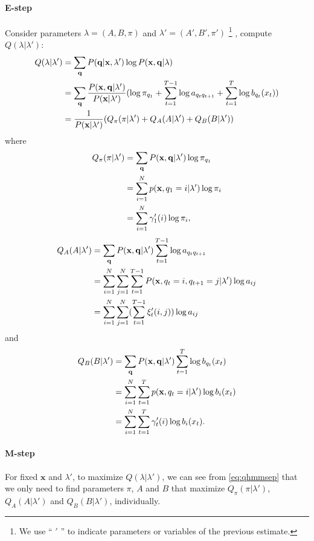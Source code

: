 \documentclass[12pt,final,twoside]{report}
\begin{document}
\paragraph{E-step}
Consider parameters $\lambda=(A,B,\pi)$ and $\lambda'=(A',B',\pi')$ 
\footnote{We use `` $'$ '' to indicate parameters or variables of the previous estimate.}
, compute $Q(\lambda|\lambda')$:
\begin{align}
  Q(\lambda|\lambda') &= \sum_{\mathbf{q}} P(\mathbf{q}|\mathbf{x},\lambda') \log P(\mathbf{x},\mathbf{q}|\lambda) \notag\\
  &= \sum_{\mathbf{q}} \frac{P(\mathbf{x},\mathbf{q}|\lambda')}{P(\mathbf{x}|\lambda')} 
  (\log \pi_{q_1} + \sum_{t=1}^{T-1} \log a_{q_t q_{t+1}} + \sum_{t=1}^{T} \log b_{q_t}(x_t) ) \notag\\
  &= \frac{1}{P(\mathbf{x}|\lambda')} (Q_\pi(\pi|\lambda') + Q_A(A|\lambda') + Q_B(B|\lambda'))
  \label{eq:qhmmsep}
\end{align}
where
\begin{align}
  Q_\pi(\pi|\lambda') &= \sum_{\mathbf{q}} P(\mathbf{x},\mathbf{q}|\lambda') \log \pi_{q_1}  \notag\\
  &= \sum_{i=1}^{N} p(\mathbf{x},q_1=i|\lambda') \log \pi_{i} \notag\\
  &= \sum_{i=1}^{N} \gamma'_1(i) \log \pi_{i},
\end{align}
\begin{align}
  Q_A(A|\lambda') &= \sum_{\mathbf{q}} P(\mathbf{x},\mathbf{q}|\lambda') \sum_{t=1}^{T-1} \log a_{q_t q_{t+1}} \notag\\
  &= \sum_{i=1}^{N} \sum_{j=1}^{N} \sum_{t=1}^{T-1} P(\mathbf{x},q_t=i,q_{t+1}=j|\lambda') \log a_{ij} \notag\\
  &= \sum_{i=1}^{N} \sum_{j=1}^{N} (\sum_{t=1}^{T-1} \xi'_t(i, j)) \log a_{ij}
\end{align}
and
\begin{align}
  Q_B(B|\lambda') &= \sum_{\mathbf{q}} P(\mathbf{x},\mathbf{q}|\lambda') \sum_{t=1}^{T} \log b_{q_t}(x_t) \notag\\
  &= \sum_{i=1}^{N} \sum_{t=1}^{T} p(\mathbf{x},q_t=i|\lambda') \log b_{i}(x_t) \notag\\
  &= \sum_{i=1}^{N} \sum_{t=1}^{T} \gamma'_t(i) \log b_{i}(x_t) .
  \label{eq:qhmmb}
\end{align}

\paragraph{M-step}
For fixed $\mathbf{x}$ and $\lambda'$, to maximize $Q(\lambda|\lambda')$, we can see from \cref{eq:qhmmsep} that we only need to find parameters $\pi$, $A$ and $B$ that maximize $Q_\pi(\pi|\lambda')$, $Q_A(A|\lambda')$ and $Q_B(B|\lambda')$, individually.
\end{document}
